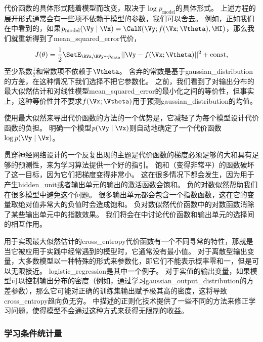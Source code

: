 代价函数的具体形式随着模型而改变，取决于$\log p_\text{model}$的具体形式。
上述方程的展开形式通常会有一些项不依赖于模型的参数，我们可以舍去。
例如，正如我们在中看到的，如果$p_\text{model}(\Vy\mid\Vx) = \CalN(\Vy;f(\Vx;\Vtheta), \MI)$，那么我们就重新得到了\gls{mean_squared_error}代价，
\begin{equation}
J(\theta) = \frac{1}{2} \SetE_{\RVx, \RVy \sim  \hat{p}_\text{data}} || \Vy - f(\Vx; \Vtheta) ||^2 + \text{const},
\end{equation}
至少系数$\frac{1}{2}$和常数项不依赖于$\Vtheta$。
舍弃的常数是基于\gls{gaussian_distribution}的方差，在这种情况下我们选择不把它参数化。
之前，我们看到了对输出分布的最大似然估计和对线性模型\gls{mean_squared_error}的最小化之间的等价性，但事实上，这种等价性并不要求$f(\Vx; \Vtheta)$用于预测\gls{gaussian_distribution}的均值。

使用最大似然来导出代价函数的方法的一个优势是，它减轻了为每个模型设计代价函数的负担。
明确一个模型$p(\Vy\mid\Vx)$则自动地确定了一个代价函数$\log p(\Vy\mid\Vx)$。

贯穿神经网络设计的一个反复出现的主题是代价函数的梯度必须足够的大和具有足够的预测性，来为学习算法提供一个好的指引。
饱和（变得非常平）的函数破坏了这一目标，因为它们把梯度变得非常小。
这在很多情况下都会发生，因为用于产生\gls{hidden_unit}或者输出单元的输出的激活函数会饱和。
负的对数似然帮助我们在很多模型中避免这个问题。
很多输出单元都会包含一个指数函数，这在它的变量取绝对值非常大的负值时会造成饱和。
负对数似然代价函数中的对数函数消除了某些输出单元中的指数效果。
我们将会在中讨论代价函数和输出单元的选择间的相互作用。


用于实现最大似然估计的\gls{cross_entropy}代价函数有一个不同寻常的特性，那就是当它被应用于实践中经常遇到的模型时，它通常没有最小值。
对于离散型输出变量，大多数模型以一种特殊的形式来参数化，即它们不能表示概率零和一，但是可以无限接近。
\gls{logistic_regression}是其中一个例子。
对于实值的输出变量，如果模型可以控制输出分布的密度（例如，通过学习\gls{gaussian_output_distribution}的方差参数），那么它可能对正确的训练集输出赋予极其高的密度，这将导致\gls{cross_entropy}趋向负无穷。
中描述的正则化技术提供了一些不同的方法来修正学习问题，使得模型不会通过这种方式来获得无限制的收益。

\subsubsection{学习条件统计量}
\label{sec:learning_conditional_statistics}

